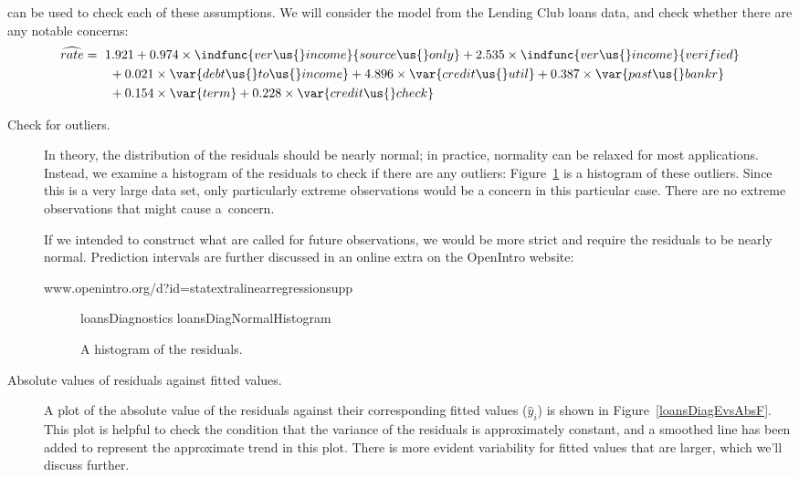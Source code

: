  can be used
to check each of these assumptions. We will consider the
model from the Lending Club loans data, and check whether
there are any notable concerns:
\begin{align*}
\widehat{rate} &= \ 1.921
    + 0.974 \times \indfunc{ver\us{}income}{source\us{}only}
    + 2.535 \times \indfunc{ver\us{}income}{verified} \\
  &\qquad
    + 0.021 \times \var{debt\us{}to\us{}income}
    + 4.896 \times \var{credit\us{}util}
    + 0.387 \times \var{past\us{}bankr} \\
  &\qquad
    + 0.154 \times \var{term}
    + 0.228 \times \var{credit\us{}check}
\end{align*}

\begin{description}
\item[Check for outliers.]
    In theory, the distribution of the residuals should
    be nearly normal;
    in practice, normality can be relaxed for most applications.
    Instead, we examine a histogram of the residuals
    to check if there are any outliers:
    Figure~\ref{loansDiagNormalHistogram}
    is a histogram of these outliers.
    Since this is a very large data set,
    only particularly extreme observations would be a concern
    in this particular case.
    There are no extreme observations that might cause a~concern.

    If we intended to construct what are called
    for future observations,
    we would be more strict and
    require the residuals to be nearly normal.
    Prediction intervals are further discussed in
    an online extra on the OpenIntro website:\vspace{-2mm}
    \begin{center}
          {www.openintro.org/d?id=stat\us{}extra\us{}linear\us{}regression\us{}supp}
    \end{center}

\begin{figure}[h]
  \centering
      {loansDiagnostics}
      {loansDiagNormalHistogram}
  \caption{A histogram of the residuals.}
  \label{loansDiagNormalHistogram}
\end{figure}

\item[Absolute values of residuals against fitted values.]
    A plot of the absolute value of the residuals against
    their corresponding fitted values ($\hat{y}_i$) is shown
    in Figure~\ref{loansDiagEvsAbsF}.
    This plot is helpful to check the condition that the
    variance of the residuals is approximately constant,
    and a smoothed line has been added to represent the
    approximate trend in this plot.
    There is more evident variability for fitted values that are
    larger, which we'll discuss further.


\end{description}
